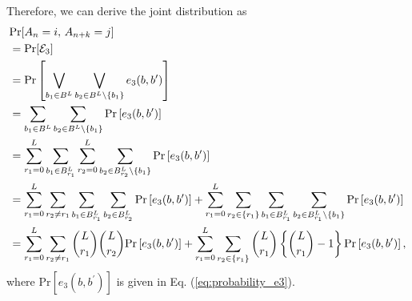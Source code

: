 \documentclass[dvipdfmx,english]{ampmt} %
\begin{document}
%
Therefore, we can derive the joint distribution as
\begin{align}\label{eq:joint_dist_3}
\begin{split}
  &\mathrm{Pr} [A_n=i ,\, A_{n+k}=j] \\
  &=\mathrm{Pr} [\mathcal{E}_3] \\
  &= \mathrm{Pr} \left[ \bigvee_{b_1 \in B^L} \bigvee_{b_2 \in B^L \setminus \{b_1\}}
  e_3(b,b^\prime) \right] \\
  &=\sum_{b_1 \in B^L} \sum_{b_2 \in B^{L} \setminus \{ b_1 \}} \mathrm{Pr} \left[ e_3(b,b^\prime) \right] \\
  &= \sum_{r_1=0}^{L} \sum_{b_1 \in B^L_{r_1}} \sum_{r_2=0}^{L} \sum_{b_2 \in B^L_{r_2} \setminus \{ b_1 \}} \mathrm{Pr} \left[ e_3(b,b^\prime) \right] \\
  &= \sum_{r_1=0}^{L} \sum_{r_2 \neq r_1} \sum_{b_1 \in B^L_{r_1}} \sum_{b_2 \in B^L_{r_2}} \mathrm{Pr} \left[e_3(b,b^\prime) \right] 
  + \sum_{r_1=0}^{L} \sum_{r_2 \in \{r_1\}} \sum_{b_1 \in B^L_{r_1}} \sum_{b_2 \in B^L_{r_1} \setminus \{ b_1 \}} \mathrm{Pr} \left[e_3(b,b^\prime) \right] \\
  &= \sum_{r_1=0}^{L} \sum_{r_2 \neq r_1} \dbinom{L}{r_1} \dbinom{L}{r_2} \mathrm{Pr} \left[e_3(b,b^\prime) \right] 
  + \sum_{r_1=0}^{L}\sum_{r_2\in\{r_1\}} \dbinom{L}{r_1} \left\{ \dbinom{L}{r_1} -1 \right\} \mathrm{Pr} \left[e_3(b,b^\prime) \right],
\end{split}
\end{align}
where $\mathrm{Pr} \left[e_3(b,b^\prime) \right]$ is given in Eq. (\ref{eq:probability_e3}).
\end{document}
